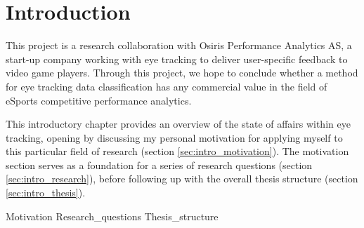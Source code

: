 \chapter{Introduction} \label{ch:intro}


This project is a research collaboration with Osiris Performance Analytics AS, a start-up company working with eye tracking to deliver user-specific feedback to video game players. Through this project, we hope to conclude whether a method for eye tracking data classification has any commercial value in the field of eSports competitive performance analytics.

This introductory chapter provides an overview of the state of affairs within eye tracking, opening by discussing my personal motivation for applying myself to this particular field of research (section \ref{sec:intro_motivation}). The motivation section serves as a foundation for a series of research questions (section \ref{sec:intro_research}), before following up with the overall thesis structure (section \ref{sec:intro_thesis}).

{Motivation}
{Research_questions}
{Thesis_structure}


